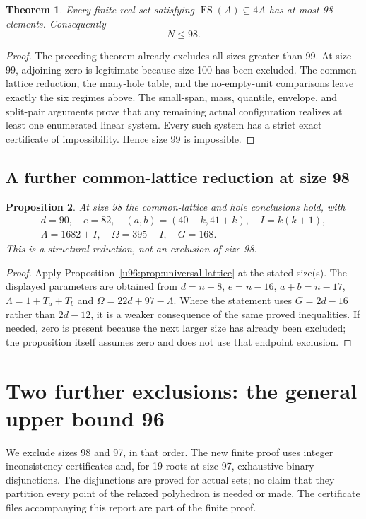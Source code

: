 \documentclass[11pt,a4paper]{article}
\newtheorem{theorem}{Theorem}[section]
\newtheorem{proposition}[theorem]{Proposition}
\theoremstyle{remark}
\newcommand{\FS}{\operatorname{FS}}
\begin{document}
\begin{theorem}\label{u96:thm:upper98}
Every finite real set satisfying $\FS(A)\subseteq4A$ has at most 98
elements. Consequently
\[
 \boxed{N\leq98}.
\]
\end{theorem}
\begin{proof}
The preceding theorem already excludes all sizes greater than 99.
At size 99, adjoining zero is legitimate because size 100 has been
excluded. The common-lattice reduction, the many-hole table, and the
no-empty-unit comparisons leave exactly the six regimes above.
The small-span, mass, quantile, envelope, and split-pair arguments prove
that any remaining actual configuration realizes at least one enumerated
linear system. Every such system has a strict exact certificate of
impossibility. Hence size 99 is impossible. 
\end{proof}

\subsection{A further common-lattice reduction at size 98}
\begin{proposition}\label{u96:prop:lattice98}
At size 98 the common-lattice and hole conclusions hold, with
\[
\begin{gathered}
 d=90,\quad e=82,\quad (a,b)=(40-k,41+k),\quad I=k(k+1),\\
 \Lambda=1682+I,\quad\Omega=395-I,\quad G=168.
\end{gathered}
\]
This is a structural reduction, not an exclusion of size 98.
\end{proposition}
\begin{proof}
Apply Proposition~\ref{u96:prop:universal-lattice} at the stated size(s).
The displayed parameters are obtained from $d=n-8$, $e=n-16$,
$a+b=n-17$, $\Lambda=1+T_a+T_b$ and $\Omega=22d+97-\Lambda$.
Where the statement uses $G=2d-16$ rather than $2d-12$, it is a weaker
consequence of the same proved inequalities. If needed, zero is present
because the next larger size has already been excluded; the proposition
itself assumes zero and does not use that endpoint exclusion.
\end{proof}

\section{Two further exclusions: the general upper bound 96}\label{u96:sec:upper96}
We exclude sizes 98 and 97, in that order. The new finite
proof uses integer inconsistency certificates and, for 19 roots at size
97, exhaustive binary disjunctions. The disjunctions are proved for actual
sets; no claim that they partition every point of the relaxed polyhedron
is needed or made. The certificate files accompanying this report are
part of the finite proof.
\end{document}
